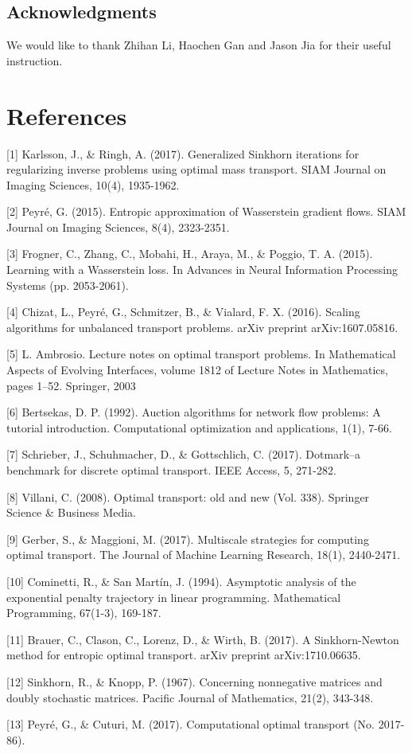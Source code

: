 \documentclass{article}
\begin{document}
\subsection*{Acknowledgments}
We would like to thank Zhihan Li, Haochen Gan and Jason Jia for their useful instruction.

\section*{References}
\medskip

[1] Karlsson, J., \& Ringh, A. (2017). Generalized Sinkhorn iterations for regularizing inverse problems using optimal mass transport. SIAM Journal on Imaging Sciences, 10(4), 1935-1962.

[2] Peyré, G. (2015). Entropic approximation of Wasserstein gradient flows. SIAM Journal on Imaging Sciences, 8(4), 2323-2351.

[3] Frogner, C., Zhang, C., Mobahi, H., Araya, M., \& Poggio, T. A. (2015). Learning with a Wasserstein loss. In Advances in Neural Information Processing Systems (pp. 2053-2061).

[4] Chizat, L., Peyré, G., Schmitzer, B., \& Vialard, F. X. (2016). Scaling algorithms for unbalanced transport problems. arXiv preprint arXiv:1607.05816.
 
 [5] L. Ambrosio. Lecture notes on optimal transport problems. In Mathematical Aspects of Evolving Interfaces, volume 1812 of Lecture Notes in Mathematics, pages 1–52. Springer, 2003
 
 [6] Bertsekas, D. P. (1992). Auction algorithms for network flow problems: A tutorial introduction. Computational optimization and applications, 1(1), 7-66.
 
 [7] Schrieber, J., Schuhmacher, D., \& Gottschlich, C. (2017). Dotmark–a benchmark for discrete optimal transport. IEEE Access, 5, 271-282.
 
 [8] Villani, C. (2008). Optimal transport: old and new (Vol. 338). Springer Science \& Business Media.
 
 [9] Gerber, S., \& Maggioni, M. (2017). Multiscale strategies for computing optimal transport. The Journal of Machine Learning Research, 18(1), 2440-2471.
 
 [10] Cominetti, R., \& San Martín, J. (1994). Asymptotic analysis of the exponential penalty trajectory in linear programming. Mathematical Programming, 67(1-3), 169-187.
 
 [11] Brauer, C., Clason, C., Lorenz, D., \& Wirth, B. (2017). A Sinkhorn-Newton method for entropic optimal transport. arXiv preprint arXiv:1710.06635.
 
 [12] Sinkhorn, R., \& Knopp, P. (1967). Concerning nonnegative matrices and doubly stochastic matrices. Pacific Journal of Mathematics, 21(2), 343-348.
 
 [13] Peyré, G., \& Cuturi, M. (2017). Computational optimal transport (No. 2017-86).
\end{document}
